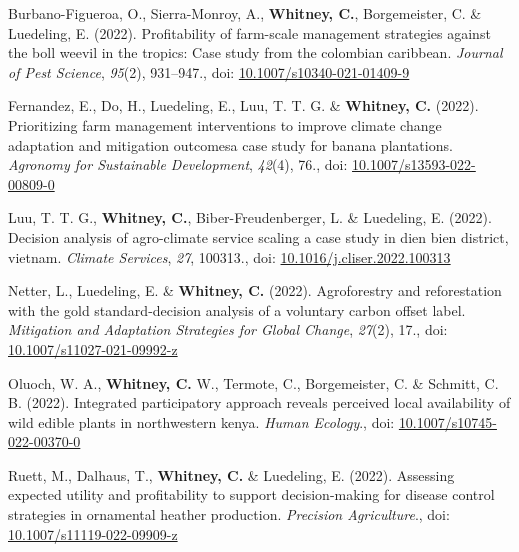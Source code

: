 \documentclass[11pt,a4paper,]{awesome-cv}
\newlength{\cslhangindent}
\newenvironment{CSLReferences}[2] %
 {\begin{list}{}{%
  \setlength{\itemindent}{0pt}
  \setlength{\leftmargin}{0pt}
  \setlength{\parsep}{0pt}
  \ifodd #1
   \setlength{\leftmargin}{\cslhangindent}
   \setlength{\itemindent}{-1\cslhangindent}
  \fi
  \setlength{\itemsep}{#2\baselineskip}}}
 {\end{list}}
\begin{document}
\begin{CSLReferences}{1}{0}
Burbano-Figueroa, O., Sierra-Monroy, A., \textbf{Whitney, C.},
Borgemeister, C. \& Luedeling, E. (2022). Profitability of farm-scale
management strategies against the boll weevil in the tropics: Case study
from the colombian caribbean. \emph{Journal of Pest Science},
\emph{95}(2), 931--947., doi:
\href{https://doi.org/10.1007/s10340-021-01409-9}{10.1007/s10340-021-01409-9}

Fernandez, E., Do, H., Luedeling, E., Luu, T. T. G. \&
\textbf{Whitney, C.} (2022). Prioritizing farm management interventions
to improve climate change adaptation and mitigation outcomesa case study
for banana plantations. \emph{Agronomy for Sustainable Development},
\emph{42}(4), 76., doi:
\href{https://doi.org/10.1007/s13593-022-00809-0}{10.1007/s13593-022-00809-0}

Luu, T. T. G., \textbf{Whitney, C.}, Biber-Freudenberger, L. \&
Luedeling, E. (2022). Decision analysis of agro-climate service scaling
a case study in dien bien district, vietnam. \emph{Climate Services},
\emph{27}, 100313., doi:
\href{https://doi.org/10.1016/j.cliser.2022.100313}{10.1016/j.cliser.2022.100313}

Netter, L., Luedeling, E. \& \textbf{Whitney, C.} (2022). Agroforestry
and reforestation with the gold standard-decision analysis of a
voluntary carbon offset label. \emph{Mitigation and Adaptation
Strategies for Global Change}, \emph{27}(2), 17., doi:
\href{https://doi.org/10.1007/s11027-021-09992-z}{10.1007/s11027-021-09992-z}

Oluoch, W. A., \textbf{Whitney, C.} W., Termote, C., Borgemeister, C. \&
Schmitt, C. B. (2022). Integrated participatory approach reveals
perceived local availability of wild edible plants in northwestern
kenya. \emph{Human Ecology}., doi:
\href{https://doi.org/10.1007/s10745-022-00370-0}{10.1007/s10745-022-00370-0}

Ruett, M., Dalhaus, T., \textbf{Whitney, C.} \& Luedeling, E. (2022).
Assessing expected utility and profitability to support decision-making
for disease control strategies in ornamental heather production.
\emph{Precision Agriculture}., doi:
\href{https://doi.org/10.1007/s11119-022-09909-z}{10.1007/s11119-022-09909-z}


\end{CSLReferences}
\end{document}
